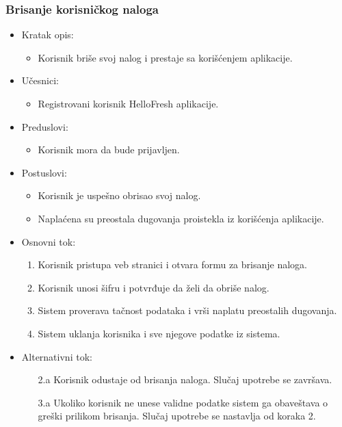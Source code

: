 \subsubsection{Brisanje korisničkog naloga}

\begin{itemize}
    \item Kratak opis:
        \begin{itemize}
            \item Korisnik briše svoj nalog i prestaje sa korišćenjem aplikacije.
        \end{itemize}
    \item Učesnici:
        \begin{itemize}
            \item Registrovani korisnik HelloFresh aplikacije.
        \end{itemize}
    \item Preduslovi:
        \begin{itemize}
            \item Korisnik mora da bude prijavljen.
        \end{itemize}
    \item Postuslovi:
        \begin{itemize}
            \item Korisnik je uspešno obrisao svoj nalog.
            \item Naplaćena su preostala dugovanja proistekla iz korišćenja aplikacije.
        \end{itemize}
    \item Osnovni tok:
        \begin{enumerate}
            \item Korisnik pristupa veb stranici i otvara formu za brisanje naloga.
            \item Korisnik unosi šifru i potvrđuje da želi da obriše nalog.
            \item Sistem proverava tačnost podataka i vrši naplatu preostalih dugovanja.
            \item Sistem uklanja korisnika i sve njegove podatke iz sistema.
        \end{enumerate}
    \item Alternativni tok:
        \begin{itemize}
            \item[2.a] Korisnik odustaje od brisanja naloga. Slučaj upotrebe se završava.
			\item[3.a] Ukoliko korisnik ne unese validne podatke sistem ga obaveštava o greški prilikom brisanja. Slučaj upotrebe se nastavlja od koraka 2.
        \end{itemize}
\end{itemize}
